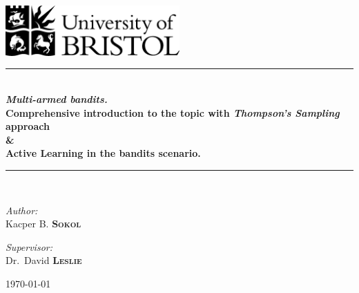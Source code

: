 \documentclass[12pt, a4paper, pdflatex]{report}
\newcommand{\HRule}{\rule{\linewidth}{0.5mm}}
\begin{document}
\begin{titlepage}
\begin{center}
\includegraphics[width=0.5\textwidth]{graphics/UOB-logo.png}~\\[4cm] %




\HRule \\[0.4cm]
{ \huge \bfseries \emph{Multi-armed bandits.}\\
	Comprehensive introduction to the topic with \emph{Thompson's Sampling} approach\\
  \&\\
  Active Learning in the bandits scenario.\\[0.4cm] }
\HRule \\[1.5cm]

\begin{minipage}{0.4\textwidth}
\begin{flushleft} \large
\emph{Author:}\\
Kacper B. \textsc{\textbf{Sokol}}
\end{flushleft}
\end{minipage}
\begin{minipage}{0.4\textwidth}
\begin{flushright} \large
\emph{Supervisor:} \\
Dr.~David \textsc{\textbf{Leslie}}
\end{flushright}
\end{minipage}

\vfill

{\large \today}
\end{center}
\end{titlepage}

\end{document}
